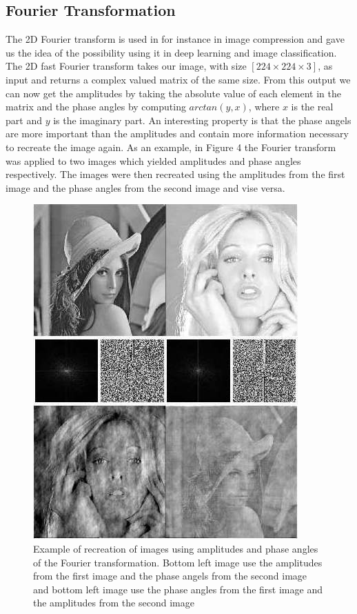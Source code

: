 \documentclass{article}
\begin{document}
\subsection{Fourier Transformation}

The 2D Fourier transform is used in for instance in image compression and gave us the idea of the possibility using it in deep learning and image classification. 
The 2D fast Fourier transform takes our image, with size $[224 \times 224 \times 3]$, as input and returns a complex valued matrix of the same size. From this output we can now get the amplitudes 
by taking the absolute value of each element in the matrix and the phase angles by computing $arctan(y, x)$, where $x$ is the real part and $y$ is the imaginary part. 
An interesting property is that the phase angels are more important than the amplitudes and contain more information necessary to recreate the image again. 
As an example, in Figure 4 the Fourier transform was applied to two images which yielded amplitudes and phase angles respectively. 
The images were then recreated using the amplitudes from the first image and the phase angles from the second image and vise versa. 

\begin{figure}[!htb]
	\centering
	\includegraphics[scale = 0.25]{fourier.jpg}
	\caption{Example of recreation of images using amplitudes and phase angles of the Fourier transformation. 
	Bottom left image use the amplitudes from the first image and the phase angels from the second image and 
	bottom left image use the phase angles from the first image and the amplitudes from the second image}
\end{figure}
\end{document}
